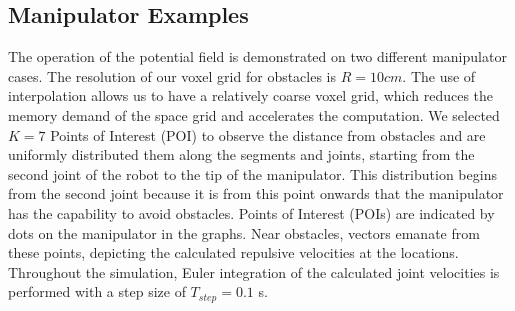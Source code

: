 \documentclass[letterpaper, 10 pt, conference]{ieeeconf}  %
\begin{document}
\subsection{Manipulator Examples}



The operation of the potential field is demonstrated on two different manipulator cases. The resolution of our voxel grid for obstacles is \( R=10cm \). The use of interpolation allows us to have a relatively coarse voxel grid, which reduces the memory demand of the space grid and accelerates the computation. We selected \( K = 7 \) Points of Interest (POI) to observe the distance from obstacles and are uniformly distributed them along the segments and joints, starting from the second joint of the robot to the tip of the manipulator. This distribution begins from the second joint because it is from this point onwards that the manipulator has the capability to avoid obstacles. Points of Interest (POIs) are indicated by dots on the manipulator in the graphs. Near obstacles, vectors emanate from these points, depicting the calculated repulsive velocities at the locations. Throughout the simulation, Euler integration of the calculated joint velocities is performed with a step size of \( T_{step} = 0.1 \) s.

\end{document}
